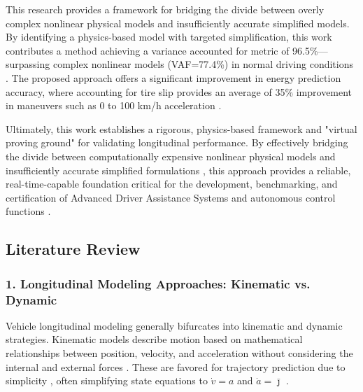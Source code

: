 \documentclass{article}
\begin{document}
This research provides a framework for bridging the divide between overly complex nonlinear physical models and insufficiently accurate simplified models. By identifying a physics-based model with targeted simplification, this work contributes a method achieving a variance accounted for metric of 96.5\%—surpassing complex nonlinear models (VAF=77.4\%) in normal driving conditions  \parencite{sebastian_s__james_30b34609}. The proposed approach offers a significant improvement in energy prediction accuracy, where accounting for tire slip provides an average of 35\% improvement in maneuvers such as 0 to 100 km/h acceleration  \parencite{naser_sina_57baad9a}. 

Ultimately, this work establishes a rigorous, physics-based framework and "virtual proving ground" for validating longitudinal performance. By effectively bridging the divide between computationally expensive nonlinear physical models and insufficiently accurate simplified formulations  \parencite[]{nour_khoudari_2d5bcaad, sebastian_s__james_30b34609}, this approach provides a reliable, real-time-capable foundation critical for the development, benchmarking, and certification of Advanced Driver Assistance Systems and autonomous control functions  \parencite[]{lorenzo_mosconi_2fca7202, muhammad_abdullah_7f4e5d18}.
\subsection{Literature Review}
\subsubsection{1. Longitudinal Modeling Approaches: Kinematic vs. Dynamic}

Vehicle longitudinal modeling generally bifurcates into kinematic and dynamic strategies. Kinematic models describe motion based on mathematical relationships between position, velocity, and acceleration without considering the internal and external forces  \parencite[]{st_phanie_lef_vre_3d7e9125, ahmad_reda_cbda68dd}. These are favored for trajectory prediction due to simplicity  \parencite{st_phanie_lef_vre_3d7e9125}, often simplifying state equations to $\dot{v} = a$ and $\dot{a} = \bar{\jmath}$  \parencite{andrea_bisoffi_9d9eed26}.
\end{document}
